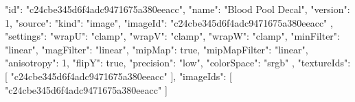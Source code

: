 {
  "id": "c24cbe345d6f4adc9471675a380eeacc",
  "name": "Blood Pool Decal",
  "version": 1,
  "source": {
    "kind": "image",
    "imageId": "c24cbe345d6f4adc9471675a380eeacc"
  },
  "settings": {
    "wrapU": "clamp",
    "wrapV": "clamp",
    "wrapW": "clamp",
    "minFilter": "linear",
    "magFilter": "linear",
    "mipMap": true,
    "mipMapFilter": "linear",
    "anisotropy": 1,
    "flipY": true,
    "precision": "low",
    "colorSpace": "srgb"
  },
  "textureIds": [
    "c24cbe345d6f4adc9471675a380eeacc"
  ],
  "imageIds": [
    "c24cbe345d6f4adc9471675a380eeacc"
  ]
}
